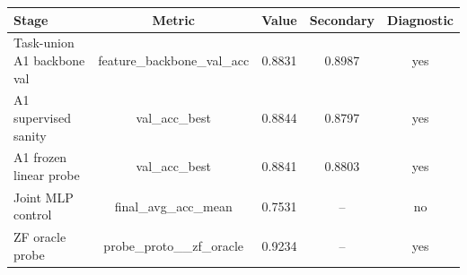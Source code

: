\begin{tabularx}{\linewidth}{lcccc}
\toprule
Stage & Metric & Value & Secondary & Diagnostic \\
\midrule
Task-union A1 backbone val & feature\_backbone\_val\_acc & 0.8831 & 0.8987 & yes \\
A1 supervised sanity & val\_acc\_best & 0.8844 & 0.8797 & yes \\
A1 frozen linear probe & val\_acc\_best & 0.8841 & 0.8803 & yes \\
Joint MLP control & final\_avg\_acc\_mean & 0.7531 & -- & no \\
ZF oracle probe & probe\_proto\_\_zf\_oracle & 0.9234 & -- & yes \\
\bottomrule
\end{tabularx}